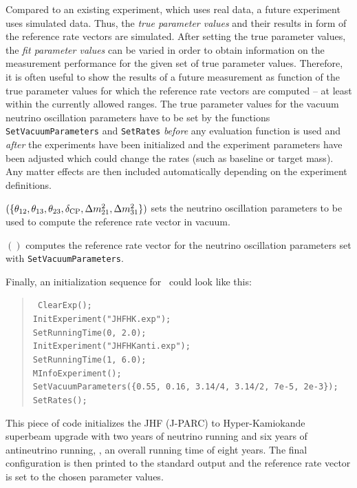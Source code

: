 Compared to an existing experiment, which uses real data, a future experiment uses simulated data. Thus, the {\em true parameter values} and their results in form of the reference rate vectors are simulated. After setting the true parameter values, the {\em fit parameter values} can be varied in order to obtain information on the measurement performance for the given set of true parameter values. Therefore, it is often useful to show the results of a future measurement as function of the true parameter values for which the reference rate vectors are computed -- at least within the currently allowed ranges. The true parameter values for the vacuum neutrino oscillation parameters have to be set by the functions {\tt SetVacuumParameters} and {\tt SetRates} {\em before} any evaluation function is used and {\em after} the experiments have been initialized and the experiment parameters have been adjusted which could change the rates (such as baseline or target mass). Any matter effects are then included automatically depending on the experiment definitions.
\begin{function}
$(\{\theta_{12}, \theta_{13}, \theta_{23}, \delta_{\mathrm{CP}} , \Delta m_{21}^2 , \Delta m_{31}^2 \})$ sets the neutrino oscillation parameters to be used to compute the reference rate vector in vacuum.
\end{function}
\begin{function}
$( )$ computes the reference rate vector for the neutrino oscillation parameters set with {\tt SetVacuumParameters}. 
\end{function}
Finally, an initialization sequence for \GLOBES\ could look like this:
\begin{quote}
{\tt
ClearExp(); \\
InitExperiment("JHFHK.exp"); \\
SetRunningTime(0, 2.0); \\
InitExperiment("JHFHKanti.exp"); \\
SetRunningTime(1, 6.0);\\
MInfoExperiment(); \\
SetVacuumParameters(\{0.55, 0.16, 3.14/4, 3.14/2, 7e-5, 2e-3\}); \\
SetRates();
} 
\end{quote}
This piece of code initializes the JHF (J-PARC) to Hyper-Kamiokande superbeam upgrade with two years of neutrino running and six years of antineutrino running, \ie, an overall running time of eight years. The final configuration is then printed to the standard output and the reference rate vector is set to the chosen parameter values.

